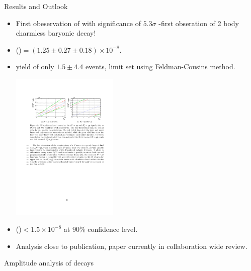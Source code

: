 \documentclass{beamer}
\begin{document}
\begin{frame}{Results and Outlook}
  \begin{itemize}
  \item First obeservation of \decay{\Bd}{\proton \antiproton} with significance of $5.3\sigma$ -first obseration of 2 body charmless baryonic \Bd decay!
  \item \BF(\decay{\Bd}{\proton \antiproton})$ = (1.25\pm0.27\pm0.18) \times 10^{-8}$.
  \item \decay{\Bs}{\proton \antiproton} yield of only $1.5\pm4.4$ events, limit set using Feldman-Cousins method.
    \begin{center}
      \includegraphics[width=0.4\textwidth]{PPBarFC.pdf}
    \end{center}
  \item \BF(\decay{\Bs}{\proton \antiproton})$ < 1.5 \times 10^{-8} $ at $90\%$ confidence level.
  \item Analysis close to publication, paper currently in collaboration wide review.
  \end{itemize}
\end{frame}

\begin{frame}
  \begin{block}{}
    {\centering Amplitude analysis of \Large \decay{\Bd}{\rhoz(\pi \pi)\Kstarz(\Kp\pim)} decays}
  \end{block}
\end{frame}
\end{document}
